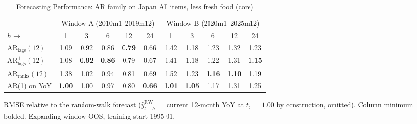\begin{table}[htbp]
\centering
\caption{Forecasting Performance: AR family on Japan All items, less fresh food (core)}
\label{tab:ar_horizon_corecpi}
\begin{tabular}{lcccccccccc}
\toprule
 & \multicolumn{5}{c}{Window A (2010m1--2019m12)} & \multicolumn{5}{c}{Window B (2020m1--2025m12)} \\
\cmidrule(lr){2-6} \cmidrule(lr){7-11}
$h \to$ & 1 & 3 & 6 & 12 & 24 & 1 & 3 & 6 & 12 & 24 \\
\midrule
$\text{AR}_{\text{lags}}(12)$     & 1.09 & 0.92 & 0.86 & \textbf{0.79} & 0.66 & 1.42 & 1.18 & 1.23 & 1.32 & 1.23 \\
$\text{AR}^{+}_{\text{lags}}(12)$ & 1.08 & \textbf{0.92} & \textbf{0.86} & 0.79 & 0.67 & 1.41 & 1.18 & 1.22 & 1.31 & \textbf{1.15} \\
$\text{AR}_{\text{ranks}}(12)$    & 1.38 & 1.02 & 0.94 & 0.81 & 0.69 & 1.52 & 1.23 & \textbf{1.16} & \textbf{1.10} & 1.19 \\
AR(1) on YoY                      & \textbf{1.00} & 1.00 & 0.97 & 0.80 & \textbf{0.66} & \textbf{1.01} & \textbf{1.05} & 1.17 & 1.31 & 1.25 \\
\bottomrule
\end{tabular}
\begin{tablenotes}\footnotesize
\item RMSE relative to the random-walk forecast
($\hat{y}^{\text{RW}}_{t+h} = $ current 12-month YoY at $t$, $=1.00$ by
construction, omitted). Column minimum bolded. Expanding-window OOS,
training start 1995-01.
\end{tablenotes}
\end{table}
